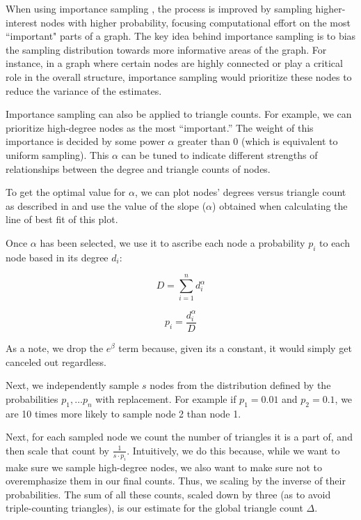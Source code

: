 \documentclass[11pt, margin=1in]{article}
\begin{document}
When using importance sampling \cite{motwani_randomized_1995}, the process is improved by sampling higher-interest nodes with higher probability, focusing computational effort on the most ``important" parts of a graph.
The key idea behind importance sampling is to bias the sampling distribution towards more informative areas of the graph.
For instance, in a graph where certain nodes are highly connected or play a critical role in the overall structure, importance sampling would prioritize these nodes to reduce the variance of the estimates.

Importance sampling can also be applied to triangle counts.
For example, we can prioritize high-degree nodes as the most ``important.''
The weight of this importance is decided by some power $\alpha$ greater than 0 (which is equivalent to uniform sampling).
This $\alpha$ can be tuned to indicate different strengths of relationships between the degree and triangle counts of nodes. 

To get the optimal value for $\alpha$, we can plot nodes' degrees versus triangle count as described in  and use the value of the slope ($\alpha$) obtained when calculating the line of best fit of this plot.

Once $\alpha$ has been selected, we use it to ascribe each node a probability $p_i$ to each node based in its degree $d_i$:

\begin{equation}
D = \sum_{i = 1}^{n} d_i^\alpha
\label{eq:D}
\end{equation}

\begin{equation}
p_i = \frac{d_i^\alpha}{D}
\label{eq:pi}
\end{equation}

As a note, we drop the $e^{\beta}$ term because, given its a constant, it would simply get canceled out regardless.

Next, we independently sample $s$ nodes from the distribution defined by the probabilities $p_1, \ldots p_n$ with replacement.
For example if $p_1 = 0.01$ and $p_2 = 0.1$, we are 10 times more likely to sample node 2 than node 1.

Next, for each sampled node we count the number of triangles it is a part of, and then scale that count by $\frac{1}{s \cdot p_i}$.
Intuitively, we do this because, while we want to make sure we sample high-degree nodes, we also want to make sure not to overemphasize them in our final counts.
Thus, we scaling by the inverse of their probabilities.
The sum of all these counts, scaled down by three (as to avoid triple-counting triangles), is our estimate for the global triangle count $\Delta$.
\end{document}
